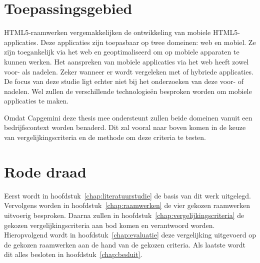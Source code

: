 \section{Toepassingsgebied} %
HTML5-raamwerken vergemakkelijken de ontwikkeling van mobiele HTML5-applicaties.
Deze applicaties zijn toepasbaar op twee domeinen: web en mobiel.
Ze zijn toegankelijk via het web en geoptimaliseerd om op mobiele apparaten te kunnen werken.
Het aanspreken van mobiele applicaties via het web heeft zowel voor- als nadelen.
Zeker wanneer er wordt vergeleken met  of hybriede applicaties.
De focus van deze studie ligt echter niet bij het onderzoeken van deze voor- of nadelen.
Wel zullen de verschillende technologieën besproken worden om mobiele applicaties te maken.

Omdat Capgemini deze thesis mee ondersteunt zullen beide domeinen vanuit een bedrijfscontext worden benaderd.
Dit zal vooral naar boven komen in de keuze van vergelijkingscriteria en de methode om deze criteria te testen.


\section{Rode draad} %
Eerst wordt in hoofdstuk~\ref{chap:literatuurstudie} de basis van dit werk uitgelegd.
Vervolgens worden in hoofdstuk~\ref{chap:raamwerken} de vier gekozen raamwerken uitvoerig besproken.
Daarna zullen in hoofdstuk~\ref{chap:vergelijkingscriteria} de gekozen vergelijkingscriteria aan bod komen en verantwoord worden.
Hieropvolgend wordt in hoofdstuk~\ref{chap:evaluatie} deze vergelijking uitgevoerd op de gekozen raamwerken aan de hand van de gekozen criteria.
Als laatste wordt dit alles besloten in hoofdstuk~\ref{chap:besluit}.

